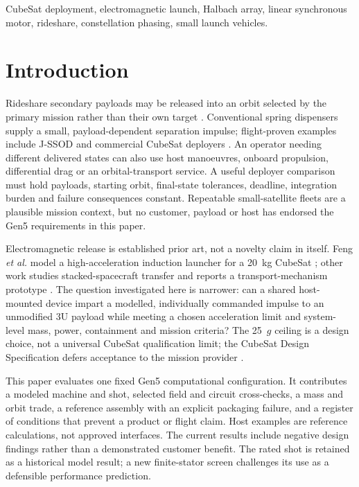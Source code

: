 \documentclass[conference]{IEEEtran}
\begin{document}
\begin{IEEEkeywords}
CubeSat deployment, electromagnetic launch, Halbach array, linear synchronous motor, rideshare, constellation phasing, small launch vehicles.
\end{IEEEkeywords}

\section{Introduction}
Rideshare secondary payloads may be released into an orbit selected by the primary mission rather than their own target \cite{soa}. Conventional spring dispensers supply a small, payload-dependent separation impulse; flight-proven examples include J-SSOD and commercial CubeSat deployers \cite{jssod,exopod}. An operator needing different delivered states can also use host manoeuvres, onboard propulsion, differential drag or an orbital-transport service. A useful deployer comparison must hold payloads, starting orbit, final-state tolerances, deadline, integration burden and failure consequences constant. Repeatable small-satellite fleets are a plausible mission context, but no customer, payload or host has endorsed the Gen5 requirements in this paper.

Electromagnetic release is established prior art, not a novelty claim in itself. Feng \emph{et al.} model a high-acceleration induction launcher for a 20~kg CubeSat \cite{feng2025}; other work studies stacked-spacecraft transfer and reports a transport-mechanism prototype \cite{stacked2022,xu2024,storage2025}. The question investigated here is narrower: can a shared host-mounted device impart a modelled, individually commanded impulse to an unmodified 3U payload while meeting a chosen acceleration limit and system-level mass, power, containment and mission criteria? The 25~$g$ ceiling is a design choice, not a universal CubeSat qualification limit; the CubeSat Design Specification defers acceptance to the mission provider \cite{cds}.

This paper evaluates one fixed Gen5 computational configuration. It contributes a modeled machine and shot, selected field and circuit cross-checks, a mass and orbit trade, a reference assembly with an explicit packaging failure, and a register of conditions that prevent a product or flight claim. Host examples are reference calculations, not approved interfaces. The current results include negative design findings rather than a demonstrated customer benefit. The rated shot is retained as a historical model result; a new finite-stator screen challenges its use as a defensible performance prediction.
\end{document}
